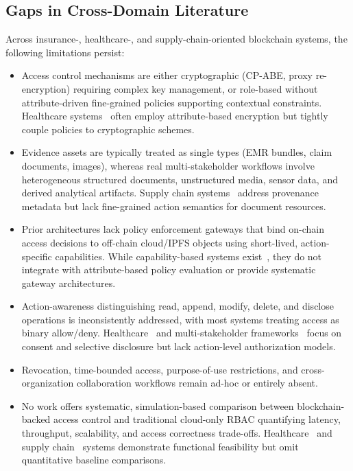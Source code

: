 \documentclass[pdflatex,sn-mathphys-num]{sn-jnl}
\begin{document}
\subsection{Gaps in Cross-Domain Literature}
Across insurance-, healthcare-, and supply-chain-oriented blockchain systems, the following limitations persist:
\begin{itemize}
	\item Access control mechanisms are either cryptographic (CP-ABE, proxy re-encryption) requiring complex key management, or role-based without attribute-driven fine-grained policies supporting contextual constraints. Healthcare systems~\cite{kaur2024ehrabac, jiang2022abeblockchain} often employ attribute-based encryption but tightly couple policies to cryptographic schemes.
	\item Evidence assets are typically treated as single types (EMR bundles, claim documents, images), whereas real multi-stakeholder workflows involve heterogeneous structured documents, unstructured media, sensor data, and derived analytical artifacts. Supply chain systems~\cite{sarfaraz2023accesschain, li2022blockchainsupply} address provenance metadata but lack fine-grained action semantics for document resources.
	\item Prior architectures lack policy enforcement gateways that bind on-chain access decisions to off-chain cloud/IPFS objects using short-lived, action-specific capabilities. While capability-based systems exist~\cite{bouras2021iotccac, hao2021smartcontract}, they do not integrate with attribute-based policy evaluation or provide systematic gateway architectures.
	\item Action-awareness distinguishing read, append, modify, delete, and disclose operations is inconsistently addressed, with most systems treating access as binary allow/deny. Healthcare~\cite{oliveira2022smartaccess, rouhani2021distributed} and multi-stakeholder frameworks~\cite{garcia2022blockchainmulti} focus on consent and selective disclosure but lack action-level authorization models.
	\item Revocation, time-bounded access, purpose-of-use restrictions, and cross-organization collaboration workflows remain ad-hoc or entirely absent.
	\item No work offers systematic, simulation-based comparison between blockchain-backed access control and traditional cloud-only RBAC quantifying latency, throughput, scalability, and access correctness trade-offs. Healthcare~\cite{kaur2024ehrabac, oliveira2022smartaccess} and supply chain~\cite{sarfaraz2023accesschain, malik2022privchain} systems demonstrate functional feasibility but omit quantitative baseline comparisons.
\end{itemize}
\end{document}
